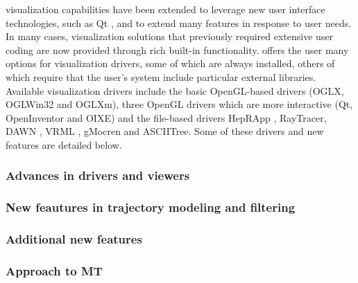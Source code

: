 
\Gfour{} visualization capabilities \cite{vis:Allison} have been extended to
leverage new user interface technologies, such as Qt \cite{vis:Qt}, and to 
extend many features in response to user needs.  In many cases, visualization 
solutions that previously required extensive user coding are now provided 
through rich built-in functionality. \Gfour{} offers the user many options for
visualization drivers, some of which are always installed, others of which 
require that the user's system include particular external libraries.  
Available visualization drivers include the basic OpenGL-based \cite{vis:OGL}
drivers (OGLX, 
OGLWin32 and OGLXm), three OpenGL drivers which are more interactive (Qt, 
OpenInventor \cite{vis:OI} and OIXE) and the file-based drivers HepRApp 
\cite{vis:HPRP}, RayTracer, DAWN \cite{vis:DAWN}, VRML \cite{vis:VRML},
gMocren \cite{vis:gMoc} and ASCIITree.  Some of these drivers and new features
are detailed below.

\subsubsection{Advances in drivers and viewers}\label{sec:drv}


\subsubsection{New feautures in trajectory modeling and filtering}\label{sec:trajectory}


\subsubsection{Additional new features}\label{sec:morefeatures}


\subsubsection{Approach to MT}\label{sec:approachMT}


